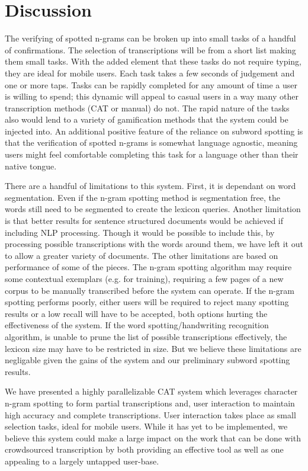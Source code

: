 \documentclass[conference]{IEEEtran}
\begin{document}
\section{Discussion}

The verifying of spotted n-grams can be broken up into small tasks of a handful of confirmations. The selection of transcriptions will be from a short list making them small tasks. With the added element that these tasks do not require typing, they are ideal for mobile users. Each task takes a few seconds of judgement and one or more taps. Tasks can be rapidly completed for any amount of time a user is willing to spend; this dynamic will appeal to casual users in a way many other transcription methods (CAT or manual) do not. The rapid nature of the tasks also would lend to a variety of gamification methods that the system could be injected into. An additional positive feature of the reliance on subword spotting is that the verification of spotted n-grams is somewhat language agnostic, meaning users might feel comfortable completing this task for a language other than their native tongue.

There are a handful of limitations to this system. First, it is dependant on word segmentation. Even if the n-gram spotting method is segmentation free, the words still need to be segmented to create the lexicon queries. Another limitation is that better results for sentence structured documents would be achieved if including NLP processing. Though it would be possible to include this, by processing possible transcriptions with the words around them, we have left it out to allow a greater variety of documents. The other limitations are based on performance of some of the pieces. The n-gram spotting algorithm may require some contextual exemplars (e.g. for training), requiring a few pages of a new corpus to be manually transcribed before the system can operate. If the n-gram spotting performs poorly, either users will be required to reject many spotting results or a low recall will have to be accepted, both options hurting the effectiveness of the system. If the word spotting/handwriting recognition algorithm, is unable to prune the list of possible transcriptions effectively, the lexicon size may have to be restricted in size. But we believe these limitations are negligable given the gains of the system and our preliminary subword spotting results.

We have presented a highly parallelizable CAT system which leverages character n-gram spotting to form partial transcriptions and, user interaction to maintain high accuracy and complete transcriptions. User interaction takes place as small selection tasks, ideal for mobile users. While it has yet to be implemented, we believe this system could make a large impact on the work that can be done with crowdsourced transcription by both providing an effective tool as well as one appealing to a largely untapped user-base.
\end{document}
